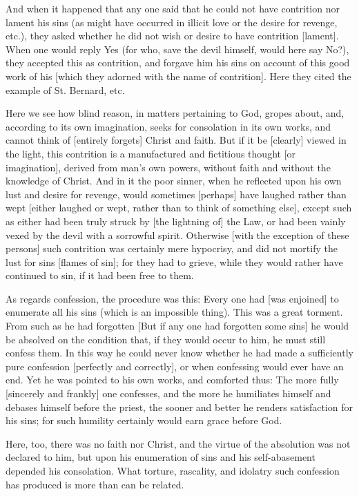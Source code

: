 And when it happened that any one said that he could not have
contrition nor lament his sins (as might have occurred in
illicit love or the desire for revenge, etc.), they asked
whether he did not wish or desire to have contrition [lament].
When one would reply Yes (for who, save the devil himself,
would here say No?), they accepted this as contrition, and
forgave him his sins on account of this good work of his
[which they adorned with the name of contrition]. Here they
cited the example of St. Bernard, etc.

Here we see how blind reason, in matters pertaining to God,
gropes about, and, according to its own imagination, seeks for
consolation in its own works, and cannot think of [entirely
forgets] Christ and faith. But if it be [clearly] viewed in
the light, this contrition is a manufactured and fictitious
thought [or imagination], derived from man's own powers,
without faith and without the knowledge of Christ. And in it
the poor sinner, when he reflected upon his own lust and
desire for revenge, would sometimes [perhaps] have laughed
rather than wept [either laughed or wept, rather than to think
of something else], except such as either had been truly
struck by [the lightning of] the Law, or had been vainly vexed
by the devil with a sorrowful spirit. Otherwise [with the
exception of these persons] such contrition was certainly mere
hypocrisy, and did not mortify the lust for sins [flames of
sin]; for they had to grieve, while they would rather have
continued to sin, if it had been free to them.

As regards confession, the procedure was this: Every one had
[was enjoined] to enumerate all his sins (which is an
impossible thing). This was a great torment. From such as he
had forgotten [But if any one had forgotten some sins] he
would be absolved on the condition that, if they would occur
to him, he must still confess them. In this way he could never
know whether he had made a sufficiently pure confession
[perfectly and correctly], or when confessing would ever have
an end. Yet he was pointed to his own works, and comforted
thus: The more fully [sincerely and frankly] one confesses,
and the more he humiliates himself and debases himself before
the priest, the sooner and better he renders satisfaction for
his sins; for such humility certainly would earn grace before
God.

Here, too, there was no faith nor Christ, and the virtue of
the absolution was not declared to him, but upon his
enumeration of sins and his self-abasement depended his
consolation. What torture, rascality, and idolatry such
confession has produced is more than can be related.


